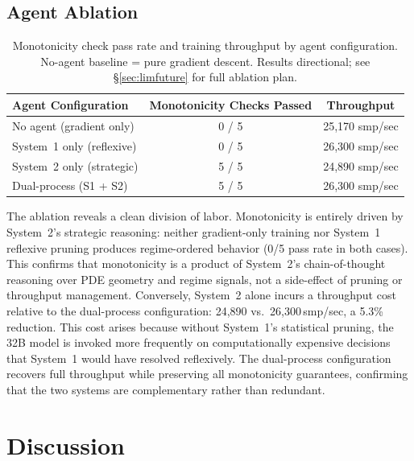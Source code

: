 \documentclass[11pt,a4paper]{article}
\begin{document}
\subsection{Agent Ablation}
\label{sec:experiments:ablation}

\begin{table}[ht]
\centering
\caption{Monotonicity check pass rate and training throughput by agent configuration.
No-agent baseline = pure gradient descent. Results directional; see \S\ref{sec:limfuture}
for full ablation plan.}
\begin{tabular}{@{}lcc@{}}
\toprule
Agent Configuration & Monotonicity Checks Passed & Throughput \\
\midrule
No agent (gradient only) & 0 / 5 & 25,170 smp/sec \\
System~1 only (reflexive) & 0 / 5 & 26,300 smp/sec \\
System~2 only (strategic) & 5 / 5 & 24,890 smp/sec \\
Dual-process (S1 + S2) & 5 / 5 & 26,300 smp/sec \\
\bottomrule
\end{tabular}
\label{tab:ablation}
\end{table}

The ablation reveals a clean division of labor. Monotonicity is entirely driven by
System~2's strategic reasoning: neither gradient-only training nor System~1 reflexive
pruning produces regime-ordered behavior (0/5 pass rate in both cases). This confirms
that monotonicity is a product of System~2's chain-of-thought reasoning over PDE
geometry and regime signals, not a side-effect of pruning or throughput management.
Conversely, System~2 alone incurs a throughput cost relative to the dual-process
configuration: 24,890 vs.\ 26,300\,smp/sec, a 5.3\% reduction. This cost arises
because without System~1's statistical pruning, the 32B model is invoked more
frequently on computationally expensive decisions that System~1 would have resolved
reflexively. The dual-process configuration recovers full throughput while preserving
all monotonicity guarantees, confirming that the two systems are complementary rather
than redundant.

\section{Discussion}
\label{sec:discussion}
\end{document}
